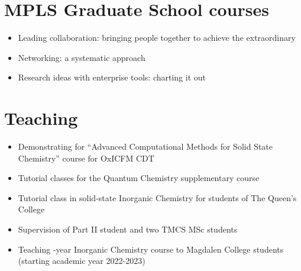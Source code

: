 \documentclass[12pt,a4paper,twoside,nobind]{ociamthesis}
\begin{document}
\section*{MPLS Graduate School courses}
\begin{itemize}
  \item Leading collaboration: bringing people together to achieve the extraordinary
  \item Networking: a systematic approach
  \item Research ideas with enterprise tools: charting it out
\end{itemize}

\section*{Teaching}
\begin{itemize}
  \item Demonstrating for ``Advanced Computational Methods for Solid State Chemistry'' course for OxICFM CDT
  \item Tutorial classes for the Quantum Chemistry supplementary course
  \item Tutorial class in solid-state Inorganic Chemistry for students of The Queen's College
  \item Supervision of Part II student and two TMCS MSc students
  \item Teaching -year Inorganic Chemistry course to Magdalen College students (starting academic year 2022-2023)
\end{itemize}
\end{document}
